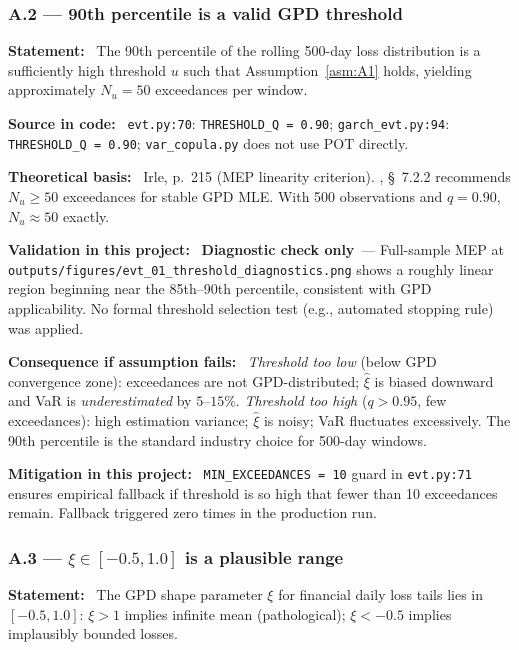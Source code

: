 \documentclass[11pt,a4paper]{article}
\newcommand{\asmfield}[1]{\medskip\noindent\textbf{#1:}\ }
\newcommand{\code}[1]{\texttt{#1}}
\newcommand{\diagnostic}{\textbf{Diagnostic check only}}
\begin{document}
\subsubsection{A.2 --- 90th percentile is a valid GPD threshold}\label{asm:A2}

\asmfield{Statement}
The 90th percentile of the rolling 500-day loss distribution is a
sufficiently high threshold $u$ such that Assumption~\cref{asm:A1}
holds, yielding approximately $N_u = 50$ exceedances per window.

\asmfield{Source in code}
\code{evt.py:70}: \lstinline|THRESHOLD_Q = 0.90|;
\code{garch\_evt.py:94}: \lstinline|THRESHOLD_Q = 0.90|;
\code{var\_copula.py} does not use POT directly.

\asmfield{Theoretical basis}
Irle, p.~215 (MEP linearity criterion). \cite{McNeilFreyEmbrechts2005},
\S~7.2.2 recommends $N_u \ge 50$ exceedances for stable GPD MLE.
With 500 observations and $q = 0.90$, $N_u \approx 50$ exactly.

\asmfield{Validation in this project}
\diagnostic\ --- Full-sample MEP at \code{outputs/figures/evt\_01\_threshold\_diagnostics.png}
shows a roughly linear region beginning near the 85th--90th percentile,
consistent with GPD applicability. No formal threshold selection test
(e.g., automated stopping rule) was applied.

\asmfield{Consequence if assumption fails}
\emph{Threshold too low} (below GPD convergence zone): exceedances are not
GPD-distributed; $\hat{\xi}$ is biased downward and VaR is
\emph{underestimated} by $5$--$15\%$. \emph{Threshold too high}
($q > 0.95$, few exceedances): high estimation variance; $\hat{\xi}$ is
noisy; VaR fluctuates excessively. The 90th percentile is the standard
industry choice for 500-day windows.

\asmfield{Mitigation in this project}
\code{MIN\_EXCEEDANCES = 10} guard in \code{evt.py:71} ensures empirical
fallback if threshold is so high that fewer than 10 exceedances remain.
Fallback triggered zero times in the production run.

\subsubsection{A.3 --- $\xi \in [-0.5, 1.0]$ is a plausible range}\label{asm:A3}

\asmfield{Statement}
The GPD shape parameter $\xi$ for financial daily loss tails lies in
$[-0.5, 1.0]$: $\xi > 1$ implies infinite mean (pathological);
$\xi < -0.5$ implies implausibly bounded losses.
\end{document}
